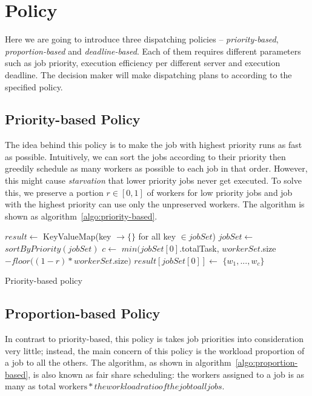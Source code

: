 \chapter{Policy}

Here we are going to introduce three dispatching policies --
\emph{priority-based}, \emph{proportion-based} and
\emph{deadline-based}.
Each of them requires different parameters such as job priority,
execution efficiency per different server and execution deadline.
The decision maker will make dispatching plans to according to the
specified policy.


\section{Priority-based Policy}

The idea behind this policy is to make the job with highest priority
runs as fast as possible.
Intuitively, we can sort the jobs according to their priority then
greedily schedule as many workers as possible to each job in that order.
However, this might cause \emph{starvation} that lower priority jobs
never get executed.
To solve this, we preserve a portion $r \in [0,1]$ of workers for low
priority jobs and job with the highest priority can use only the
unpreserved workers.
The algorithm is shown as algorithm~\ref{algo:priority-based}.

\begin{algorithm}
  \DontPrintSemicolon %
  $result \gets$
  KeyValueMap(key $\to \{\}$ for all key $\in jobSet$)\;
  $jobSet \gets$ $sortByPriority(jobSet)$\;
  $c \gets$ $min(jobSet[0]$.totalTask, $workerSet$.size$-floor((1-r) *
      workerSet.$size$)$\;
  $result[jobSet[0]] \gets$ $\{w_1, ..., w_c\}$\;
  \;
  \caption{Priority-based policy}
  \label{algo:priority-based}
\end{algorithm}

\section{Proportion-based Policy}

In contrast to priority-based, this policy is takes job priorities into
consideration very little; instead, the main concern of this policy is
the workload proportion of a job to all the others.
The algorithm, as shown in algorithm~\ref{algo:proportion-based}, is
also known as fair share scheduling: the workers assigned to a job is as
many as $\text{total workers} * the workload ratio of the job to all
jobs$.


